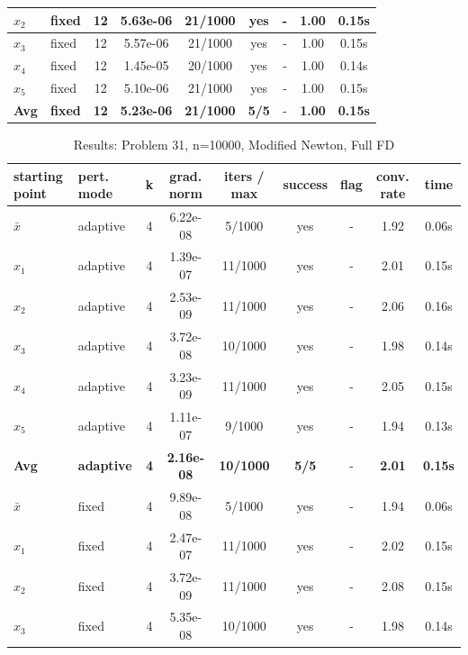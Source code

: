 \begin{longtable}{|l|l|c|c|c|c|c|c|c|}
\hline
$x_2$ & fixed & 12 & 5.63e-06 & 21/1000 & yes & - & 1.00 & 0.15s \\
\hline
$x_3$ & fixed & 12 & 5.57e-06 & 21/1000 & yes & - & 1.00 & 0.15s \\
\hline
$x_4$ & fixed & 12 & 1.45e-05 & 20/1000 & yes & - & 1.00 & 0.14s \\
\hline
$x_5$ & fixed & 12 & 5.10e-06 & 21/1000 & yes & - & 1.00 & 0.15s \\
\hline
\hline\hline
\textbf{Avg} & \textbf{fixed} & \textbf{12} & \textbf{5.23e-06} & \textbf{21/1000} & \textbf{5/5} & - & \textbf{1.00} & \textbf{0.15s} \\
\hline\hline
\end{longtable}


\begin{longtable}{|l|l|c|c|c|c|c|c|c|}
\caption{Results: Problem 31, n=10000, Modified Newton, Full FD} \\
\hline
\textbf{starting point} & \textbf{pert. mode} & \textbf{k} & \textbf{grad. norm} & \textbf{iters / max} & \textbf{success} & \textbf{flag} & \textbf{conv. rate} & \textbf{time} \\
\hline
\endfirsthead
\endhead
\endfoot
\hline
\endlastfoot
$\bar{x}$ & adaptive & 4 & 6.22e-08 & 5/1000 & yes & - & 1.92 & 0.06s \\
\hline
$x_1$ & adaptive & 4 & 1.39e-07 & 11/1000 & yes & - & 2.01 & 0.15s \\
\hline
$x_2$ & adaptive & 4 & 2.53e-09 & 11/1000 & yes & - & 2.06 & 0.16s \\
\hline
$x_3$ & adaptive & 4 & 3.72e-08 & 10/1000 & yes & - & 1.98 & 0.14s \\
\hline
$x_4$ & adaptive & 4 & 3.23e-09 & 11/1000 & yes & - & 2.05 & 0.15s \\
\hline
$x_5$ & adaptive & 4 & 1.11e-07 & 9/1000 & yes & - & 1.94 & 0.13s \\
\hline
\hline\hline
\textbf{Avg} & \textbf{adaptive} & \textbf{4} & \textbf{2.16e-08} & \textbf{10/1000} & \textbf{5/5} & - & \textbf{2.01} & \textbf{0.15s} \\
\hline\hline
\hline
$\bar{x}$ & fixed & 4 & 9.89e-08 & 5/1000 & yes & - & 1.94 & 0.06s \\
\hline
$x_1$ & fixed & 4 & 2.47e-07 & 11/1000 & yes & - & 2.02 & 0.15s \\
\hline
$x_2$ & fixed & 4 & 3.72e-09 & 11/1000 & yes & - & 2.08 & 0.15s \\
\hline
$x_3$ & fixed & 4 & 5.35e-08 & 10/1000 & yes & - & 1.98 & 0.14s \\

\end{longtable}
